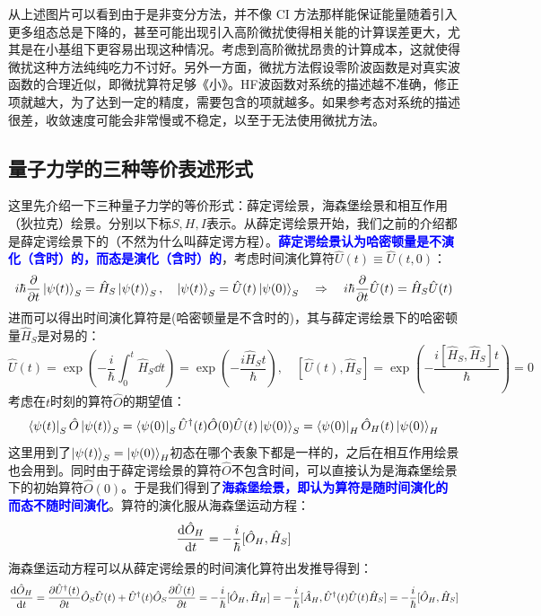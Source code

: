 从上述图片可以看到由于是非变分方法，并不像 CI 方法那样能保证能量随着引入更多组态总是下降的，甚至可能出现引入高阶微扰使得相关能的计算误差更大，尤其是在小基组下更容易出现这种情况。考虑到高阶微扰昂贵的计算成本，这就使得微扰这种方法纯纯吃力不讨好。另外一方面，微扰方法假设零阶波函数是对真实波函数的合理近似，即微扰算符足够《小》。HF波函数对系统的描述越不准确，修正项就越大，为了达到一定的精度，需要包含的项就越多。如果参考态对系统的描述很差，收敛速度可能会非常慢或不稳定，以至于无法使用微扰方法。

\newpage
\subsection{量子力学的三种等价表述形式}
这里先介绍一下三种量子力学的等价形式：薛定谔绘景，海森堡绘景和相互作用（狄拉克）绘景。分别以下标$S,H,I$表示。从薛定谔绘景开始，我们之前的介绍都是薛定谔绘景下的（不然为什么叫薛定谔方程）。\textcolor{blue}{\textbf{薛定谔绘景认为哈密顿量是不演化（含时）的，而态是演化（含时）的}}，考虑时间演化算符$\hat{U}(t)\equiv\hat{U}(t,0)$：
\[i\hbar\pdv{t}\ket{\psi(t)}_S=\hat{H}_S\ket{\psi(t)}_S, \quad \ket{\psi(t)}_S=\hat{U}(t)\ket{\psi(0)}_S \quad \Rightarrow \quad i\hbar\pdv{t}\hat{U}(t)=\hat{H}_S\hat{U}(t)\]
进而可以得出时间演化算符是(哈密顿量是不含时的)，其与薛定谔绘景下的哈密顿量$\hat{H}_S$是对易的：
\[\hat{U}(t)=\exp\left(-\frac{i}{\hbar}\int_{0}^{t}\hat{H}_S\dd{t}\right)=\exp\left(-\frac{i\hat{H}_St}{\hbar}\right), \quad [\hat{U}(t),\hat{H}_S]=\exp\left(-\frac{i[\hat{H}_S,\hat{H}_S]t}{\hbar}\right)=0\]
考虑在$t$时刻的算符$\hat{O}$的期望值：
\[\bra{\psi(t)}_S\hat{O}\ket{\psi(t)}_S=\bra{\psi(0)}_S\hat{U}^{\dagger}(t)\hat{O}(0)\hat{U}(t)\ket{\psi(0)}_S=\bra{\psi(0)}_H\hat{O}_H(t)\ket{\psi(0)}_H\]
这里用到了$\ket{\psi(t)}_S=\ket{\psi(0)}_H$初态在哪个表象下都是一样的，之后在相互作用绘景也会用到。同时由于薛定谔绘景的算符$\hat{O}$不包含时间，可以直接认为是海森堡绘景下的初始算符$\hat{O}(0)$。于是我们得到了\textcolor{blue}{\textbf{海森堡绘景，即认为算符是随时间演化的而态不随时间演化}}。算符的演化服从海森堡运动方程：
\[\dv{\hat{O}_H}{t}=-\frac{i}{\hbar}[\hat{O}_H,\hat{H}_S]\]
海森堡运动方程可以从薛定谔绘景的时间演化算符出发推导得到：
\[\dv{\hat{O}_H}{t}=\frac{\partial\hat{U}^{\dagger}(t)}{\partial t}\hat{O}_S\hat{U}(t)+\hat{U}^{\dagger}(t)\hat{O}_S\frac{\partial\hat{U}(t)}{\partial t}=-\frac{i}{\hbar}[\hat{O}_H,\hat{H}_H]=-\frac{i}{\hbar}[\hat{A}_H,\hat{U}^\dagger(t)\hat{U}(t)\hat{H}_S]=-\frac{i}{\hbar}[\hat{O}_H,\hat{H}_S]\]


